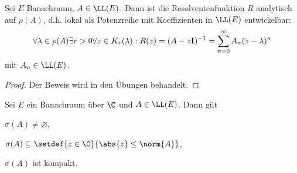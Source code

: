 \begin{prop}
\label{prop:6.5}
Sei $E$ Banachraum, $A\in\LL(E)$. Dann ist die Resolventenfunktion $R$
analytisch auf $\rho(A)$, d.h. lokal als Potenzreihe mit Koeffizienten in
$\LL(E)$ entwickelbar:
\begin{align*}
\forall \lambda\in\rho(A) \exists r > 0 \forall z\in K_r(\lambda) :
R(z) = (A-z\mathbf{I})^{-1} = \sum\limits_{n=0}^\infty A_n(z-\lambda)^n
\end{align*}
mit $A_n\in\LL(E)$.\fishhere
\end{prop}
\begin{proof}
Der Beweis wird in den Übungen behandelt.\qedhere
\end{proof}

\begin{prop}
\label{prop:6.6}
Sei $E$ ein Banachraum über $\C$ und $A\in\LL(E)$. Dann gilt
\begin{propenum}
  \item\label{prop:6.6:1} $\sigma(A)\neq \varnothing$,
  \item\label{prop:6.6:2} $\sigma(A) \subseteq
  \setdef{z\in\C}{\abs{z}\le\norm{A}}$,
  \item\label{prop:6.6:3} $\sigma(A)$ ist kompakt.\fishhere
\end{propenum}
\end{prop}
